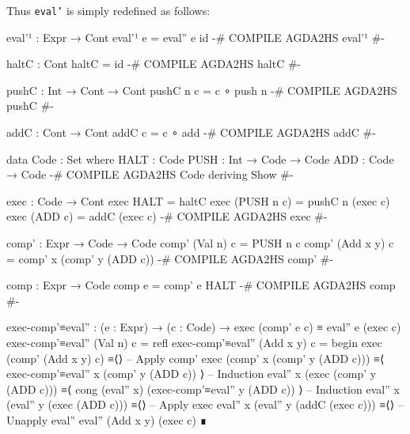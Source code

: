 \documentclass{article}
\begin{document}
Thus \texttt{eval'} is simply redefined as follows:

\begin{code}
eval'¹ : Expr → Cont
eval'¹ e = eval'' e id
{-# COMPILE AGDA2HS eval'¹ #-}
\end{code}
\begin{code}
haltC : Cont
haltC = id
{-# COMPILE AGDA2HS haltC #-}

pushC : Int → Cont → Cont
pushC n c = c ∘ push n
{-# COMPILE AGDA2HS pushC #-}

addC : Cont → Cont
addC c = c ∘ add
{-# COMPILE AGDA2HS addC #-}

data Code : Set where
  HALT : Code
  PUSH : Int → Code → Code
  ADD : Code → Code
{-# COMPILE AGDA2HS Code deriving Show #-}

exec : Code → Cont
exec HALT = haltC
exec (PUSH n c) = pushC n (exec c)
exec (ADD c) = addC (exec c)
{-# COMPILE AGDA2HS exec #-}

comp' : Expr → Code → Code
comp' (Val n) c = PUSH n c
comp' (Add x y) c = comp' x (comp' y (ADD c))
{-# COMPILE AGDA2HS comp' #-}

comp : Expr → Code
comp e = comp' e HALT
{-# COMPILE AGDA2HS comp #-}
\end{code}
\begin{code}
exec-comp'≡eval'' : (e : Expr) → (c : Code)
  → exec (comp' e c) ≡ eval'' e (exec c)
exec-comp'≡eval'' (Val n) c = refl
exec-comp'≡eval'' (Add x y) c =
  begin
    exec (comp' (Add x y) c)
  ≡⟨⟩ -- Apply comp'
    exec (comp' x (comp' y (ADD c)))
  ≡⟨ exec-comp'≡eval'' x (comp' y (ADD c)) ⟩ -- Induction
    eval'' x (exec (comp' y (ADD c)))
  ≡⟨ cong (eval'' x) (exec-comp'≡eval'' y (ADD c)) ⟩ -- Induction
    eval'' x (eval'' y (exec (ADD c)))
  ≡⟨⟩ -- Apply exec
    eval'' x (eval'' y (addC (exec c)))
  ≡⟨⟩ -- Unapply eval''
    eval'' (Add x y) (exec c)
  ∎
\end{code}
\end{document}

